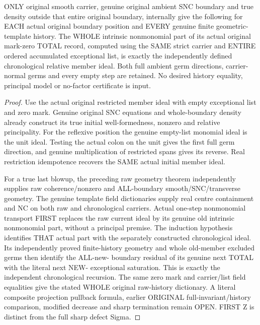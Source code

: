 \begin{theorem}
\label{hir:sharp-actual-original-member-total-history-residual-dictionary}
\leanok
ONLY original smooth carrier, genuine original ambient SNC boundary and
true density outside that entire original boundary, internally give the
following for EACH actual original boundary position and EVERY genuine
finite geometric-template history. The WHOLE intrinsic nonmonomial part
of its actual original mark-zero TOTAL record, computed using the SAME
strict carrier and ENTIRE ordered accumulated exceptional list, is exactly
the independently defined chronological relative member ideal. Both full
ambient germ directions, carrier-normal germs and every empty step are
retained. No desired history equality, principal model or no-factor
certificate is input.
\end{theorem}
\begin{proof}
Use the actual original restricted member ideal with empty exceptional
list and zero mark. Genuine original SNC equations and whole-boundary
density already construct its true initial well-formedness, nonzero and
relative principality. For the reflexive position the genuine empty-list
monomial ideal is the unit ideal. Testing the actual colon on the unit
gives the first full germ direction, and genuine multiplication of
restricted spans gives its reverse. Real restriction idempotence recovers
the SAME actual initial member ideal.

For a true last blowup, the preceding raw geometry theorem independently
supplies raw coherence/nonzero and ALL-boundary smooth/SNC/transverse
geometry. The genuine template field dictionaries supply real centre
containment and NC on both raw and chronological carriers. Actual
one-step nonmonomial transport FIRST replaces the raw current ideal by
its genuine old intrinsic nonmonomial part, without a principal premise.
The induction hypothesis identifies THAT actual part with the separately
constructed chronological ideal. Its independently proved finite-history
geometry and whole old-member excluded germs then identify the ALL-new-
boundary residual of its genuine next TOTAL with the literal next NEW-
exceptional saturation. This is exactly the independent chronological
recursion. The same zero mark and carrier/list field equalities give the
stated WHOLE original raw-history dictionary. A literal composite
projection pullback formula, earlier ORIGINAL full-invariant/history
comparison, modified decrease and sharp termination remain OPEN. FIRST Z
is distinct from the full sharp defect Sigma.
\end{proof}
